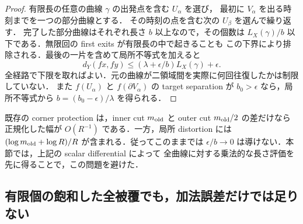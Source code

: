 \begin{proof}
有限長の任意の曲線 $\gamma$ の出発点を含む $U_\alpha$ を選び，
最初に $V_\alpha$ を出る時刻までを一つの部分曲線とする．
その時刻の点を含む次の $U_\beta$ を選んで繰り返す．
完了した部分曲線はそれぞれ長さ $b$ 以上なので，その個数は
$L_X(\gamma)/b$ 以下である．無限回の first exits が有限長の中で起きることも
この下界により排除される．最後の一片を含めて局所不等式を加えると
\[
 d_Y(fx,fy)\le(\lambda+\epsilon/b)L_X(\gamma)+\epsilon.
\]
全経路で下限を取ればよい．元の曲線が二領域間を実際に何回往復したかは制限していない．
また $f(U_\alpha)$ と $f(\partial V_\alpha)$ の target separation が $b_0>\epsilon$
なら，局所不等式から $b=(b_0-\epsilon)/\lambda$ を得られる．
\end{proof}

既存の corner protection は，inner cut $m_{\rm old}$ と
outer cut $m_{\rm old}/2$ の差だけなら
正規化した幅が $O(R^{-1})$ である．一方，局所 distortion には
$(\log m_{\rm old}+\log R)/R$ が含まれる．従ってこのままでは
$\epsilon/b\to0$ は導けない．本節では，上記の scalar differential によって
全曲線に対する乗法的な長さ評価を先に得ることで，この問題を避けた．

\subsection{有限個の飽和した全被覆でも，加法誤差だけでは足りない}

